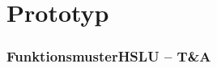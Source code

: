 \section{Prototyp}

\begin{frame}
	\frametitle{Funktionsmuster\hfill{}\footnotesize HSLU -- T\&A}
	
\end{frame}
